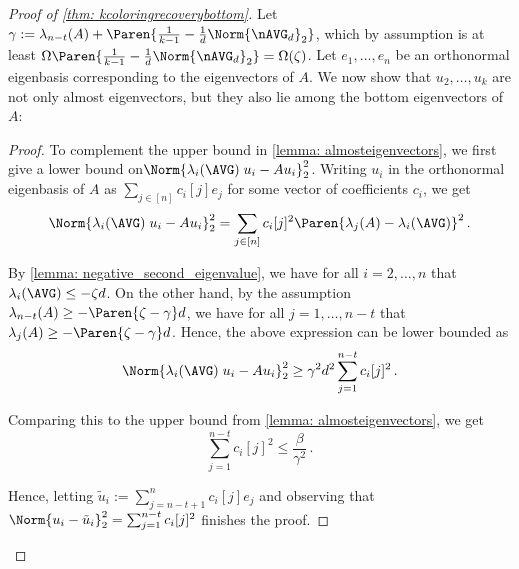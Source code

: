 \begin{proof}[Proof of \cref{thm: kcoloringrecoverybottom}]
    Let $\gamma:= \lambda_{n-t}(A)+\Paren{\frac{1}{k-1}-\frac{1}{d}\Norm{\nAVG_d}_2}$, which by assumption is at least $\Omega\Paren{\frac{1}{k-1}-\frac{1}{d}\Norm{\nAVG_d}_2} = \Omega(\zeta)$.
    Let $e_1, \ldots, e_n$ be an orthonormal eigenbasis corresponding to the eigenvectors of $A$.
    We now show that $u_2, \ldots, u_k$ are not only almost eigenvectors, but they also lie among the bottom eigenvectors of $A$:

    \begin{proof}
        To complement the upper bound in \cref{lemma: almosteigenvectors}, we first give a lower bound on\linebreak$\Norm{\lambda_i(\AVG)\; u_i-A u_i}_2^2$.
        Writing $u_i$ in the orthonormal eigenbasis of $A$ as $\sum_{j\in [n]}c_i[j]e_j$ for some vector of coefficients $c_i$, we get
        $$\Norm{\lambda_i(\AVG)\; u_i-A u_i}_2^2=\sum_{j\in [n]} c_{i}[j]^2\Paren{\lambda_j(A)-\lambda_i(\AVG)}^2\,.$$

        By \cref{lemma: negative_second_eigenvalue}, we have for all $i = 2, \ldots, n$ that $\lambda_i(\AVG)\leq -\zeta d$.
        On the other hand, by the assumption $\lambda_{n-t}(A)\geq -\Paren{\zeta -\gamma}d$, we have for all $j = 1, \ldots, n-t$ that $\lambda_j(A)\geq -\Paren{\zeta -\gamma}d$.
        Hence, the above expression can be lower bounded as
        $$\Norm{\lambda_i(\AVG)\; u_i-A u_i}_2^2 \geq \gamma^2 d^2\sum_{j = 1}^{n-t} c_{i}[j]^2\,.$$

        Comparing this to the upper bound from \cref{lemma: almosteigenvectors}, we get
        $$\sum_{j = 1}^{n-t} c_{i}[j]^2\leq \frac{\beta}{\gamma^2}\,.$$

        Hence, letting $\tilde{u}_i:=\sum_{j = n-t+1}^{n}c_i[j]e_j$ and observing that $\Norm{u_i-\tilde{u}_i}_2^2=\sum_{j=1}^{n-t} c_{i}[j]^2$ finishes the proof.
    \end{proof}


\end{proof}
